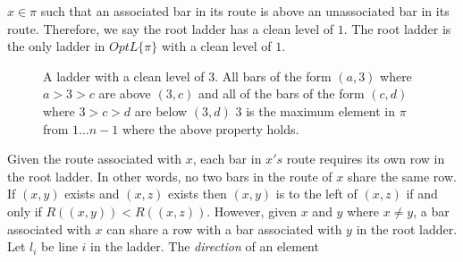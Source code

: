 $x \in \pi$ such that an associated bar in its route is above an unassociated bar in its route. Therefore, we say the root ladder has a clean 
level of $1$. The root ladder is the only ladder in $OptL\{\pi\}$ with a clean level of $1$.
\begin{figure}[ht]
    \centering
    \caption{A ladder with a clean level of $3$. All bars of the form $(a,3)$ where $a>3>c$ are above 
    $(3,c)$ and all of the bars of the form $(c,d)$ where $3>c>d$ are below $(3,d)$ $3$ is the maximum 
    element in $\pi$ from $1 \dots n-1$ where the above property holds.}
    \label{Fig:CleanLevel2}
\end{figure}
Given the route associated with $x$, each bar in $x's$ route requires its own row in the root ladder. In other words, 
no two bars in the route of $x$ share the same row. If $(x,y)$ exists and $(x,z)$ exists then  
$(x,y)$ is to the left of $(x,z)$ if and only if $R((x,y))<R((x,z))$. However, given $x$ and $y$ where $x \neq y$, a bar 
associated with $x$ can share a row with a bar associated with $y$ in the root ladder. Let $l_{i}$ be line $i$ in the ladder. The \emph{direction} of an element 

